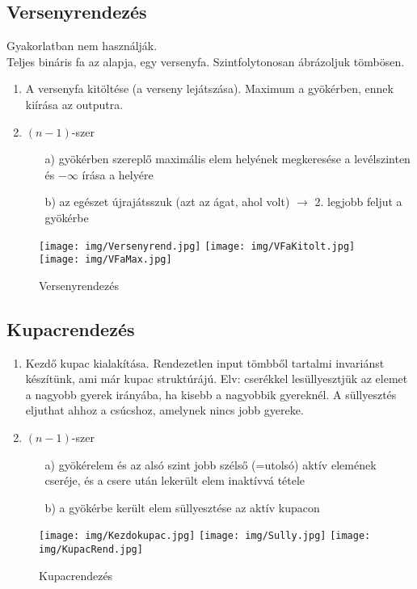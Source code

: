 \documentclass[margin=0px]{article}
\begin{document}
\subsection{Versenyrendezés}

Gyakorlatban nem használják. \\
Teljes bináris fa az alapja, egy versenyfa. Szintfolytonosan ábrázoljuk tömbösen.\\
\begin{enumerate}
    \item A versenyfa kitöltése (a verseny lejátszása). Maximum a gyökérben, ennek kiírása az outputra.
    \item $(n-1)$-szer
          \begin{itemize}
              \item[a)] gyökérben szereplő maximális elem helyének megkeresése a levélszinten és $-\infty$ írása a helyére
              \item[b)] az egészet újrajátsszuk (azt az ágat, ahol volt) $\to$ 2. legjobb feljut a gyökérbe
          \end{itemize}
\end{enumerate}
\begin{figure}[H]
    \centering
    \texttt{[image: img/Versenyrend.jpg]}
    \texttt{[image: img/VFaKitolt.jpg]}
    \texttt{[image: img/VFaMax.jpg]}
    \caption{Versenyrendezés}
\end{figure}

\subsection{Kupacrendezés}

\begin{enumerate}
    \item Kezdő kupac kialakítása. Rendezetlen input tömbből tartalmi invariánst készítünk, ami már kupac struktúrájú. Elv: cserékkel lesüllyesztjük az elemet a nagyobb gyerek irányába, ha kisebb a nagyobbik gyereknél. A süllyesztés eljuthat ahhoz a csúcshoz, amelynek nincs jobb gyereke.
    \item $(n-1)$-szer
          \begin{itemize}
              \item[a)] gyökérelem és az alsó szint jobb szélső (=utolsó) aktív elemének cseréje, és a csere után lekerült elem inaktívvá tétele
              \item[b)] a gyökérbe került elem süllyesztése az aktív kupacon
          \end{itemize}
\end{enumerate}
\begin{figure}[H]
    \centering
    \texttt{[image: img/Kezdokupac.jpg]}
    \texttt{[image: img/Sully.jpg]}
    \texttt{[image: img/KupacRend.jpg]}
    \caption{Kupacrendezés}
\end{figure}
\end{document}
